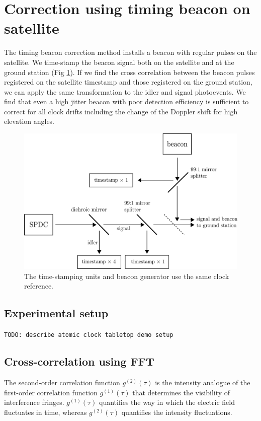 \section{Correction using timing beacon on satellite}
The timing beacon correction method installs a beacon with regular pulses on the satellite. We time-stamp the beacon signal both on the satellite and at the ground station (Fig \ref{fig:beacon}). If we find the cross correlation between the beacon pulses registered on the satellite timestamp and those registered on the ground station, we can apply the same transformation to the idler and signal photoevents. We find that even a high jitter beacon with poor detection efficiency is sufficient to correct for all clock drifts including the change of the Doppler shift for high elevation angles.

\begin{figure}[ht!]
	\includegraphics[width=0.97\linewidth]{assets/beacon}
	\caption{The time-stamping units and beacon generator use the same clock reference.}
	\label{fig:beacon}
\end{figure}

\subsection{Experimental setup}
\texttt{TODO: describe atomic clock tabletop demo setup}

\subsection{Cross-correlation using FFT}

The second-order correlation function $g^{(2)}(\tau)$ is the intensity analogue of the first-order correlation function $g^{(1)}(\tau)$ that determines the visibility of interference fringes. $g^{(1)}(\tau)$ quantifies the way in which the electric field fluctuates in time, whereas $g^{(2)}(\tau)$ quantifies the intensity fluctuations.